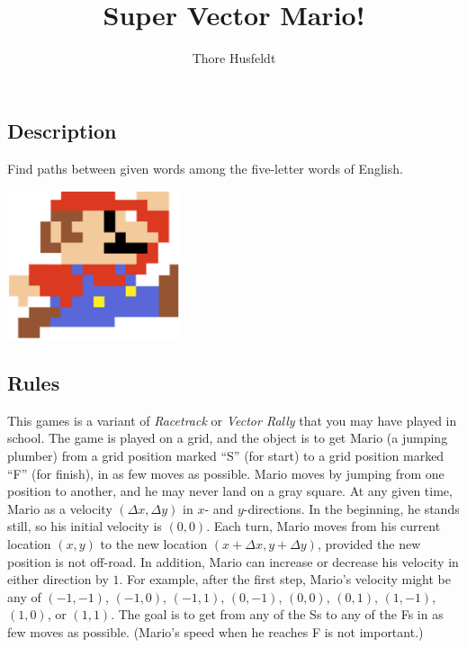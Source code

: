 \documentclass{tufte-handout}
\title{Super Vector Mario!}
\author{Thore Husfeldt}
\begin{document}
\maketitle

\subsection{Description}
Find paths between given words among the five-letter words of English.

\begin{marginfigure}
\includegraphics[width = 2in]{mario.png}
\end{marginfigure}

\subsection{Rules}
This games is a variant of \emph{Racetrack} or \emph{Vector Rally} that you may have played in school.
The game is played on a grid, and the object is to get Mario (a jumping plumber) from a grid position marked ``S'' (for start) to a grid position marked ``F'' (for finish), in as few moves as possible.
Mario moves by jumping from one position to another, and he may never land on a gray square.
At any given time, Mario as a velocity $(\Delta x, \Delta y)$ in $x$- and $y$-directions.
In the beginning, he stands still, so his initial velocity is $(0,0)$.
Each turn, Mario moves from his current location $(x,y)$ to the new location $(x+\Delta x, y+\Delta y)$, provided the new position is not off-road.
In addition, Mario can increase or decrease his velocity in either direction by $1$.
For example, after the first step, Mario’s velocity might be any of $(-1,-1)$,  $(-1,0)$, $(-1,1)$, $(0,-1)$, $(0,0)$, $(0,1)$, $(1,-1)$, $(1,0)$, or $(1,1)$.
The goal is to get from any of the Ss to any of the Fs in as few moves as possible.
(Mario's speed when he reaches F is not important.)
\end{document}
